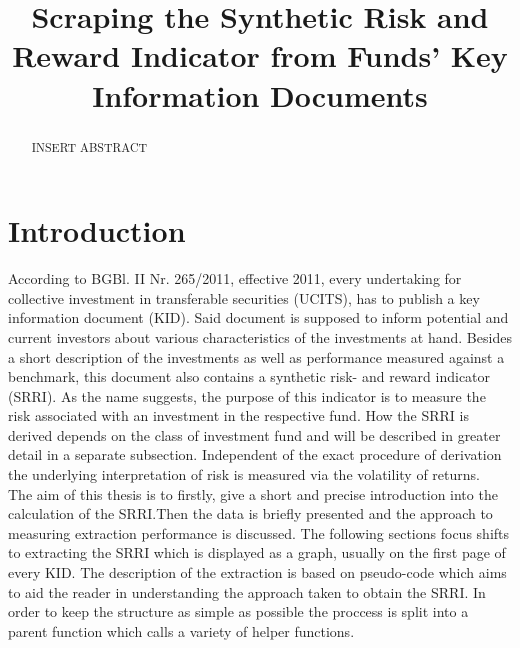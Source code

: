 \documentclass[aodsor,preprint]{imsart}
\numberwithin{equation}{section}
\theoremstyle{plain}
\begin{document}
\begin{frontmatter}
\title{Scraping the Synthetic Risk and Reward Indicator from Funds' Key Information Documents}

\begin{aug}
\author{ }





\end{aug}

\begin{abstract}
INSERT ABSTRACT
\end{abstract}

\begin{keyword}[class=MSC]
\end{keyword}

\begin{keyword}
\kwd{\LaTeXe}
\end{keyword}

\end{frontmatter}

\section{Introduction}
According to BGBl. II Nr. 265/2011, effective 2011, every undertaking for collective investment in transferable securities (UCITS), has to publish a key information document (KID)\citep{BGB1}. Said document is supposed to inform potential and current investors about various characteristics of the investments at hand. Besides a short description of the investments as well as performance measured against a benchmark, this document also contains a synthetic risk- and reward indicator (SRRI). As the name suggests, the purpose of this indicator is to measure the risk associated with an investment in the respective fund. How the SRRI is derived depends on the class of investment fund and will be described in greater detail in a separate subsection. Independent of the exact procedure of derivation the underlying interpretation of risk is measured via the volatility of returns.\\
The aim of this thesis is to firstly, give a short and precise introduction into the calculation of the SRRI.Then the data is briefly presented and the approach to measuring extraction performance is discussed. The following sections focus shifts to extracting the SRRI which is displayed as a graph, usually on the first page of every KID. The description of the extraction is based on pseudo-code which aims to aid the reader in understanding the approach taken to obtain the SRRI. In order to keep the structure as simple as possible the proccess is split into a parent function which calls a variety of helper functions.
\end{document}
